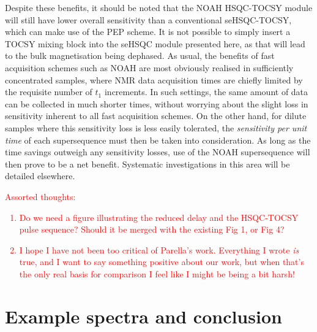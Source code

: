 \documentclass[11pt]{article}
\newcommand*{\red}[1]{\textcolor{red}{#1}}
\begin{document}
Despite these benefits, it should be noted that the NOAH HSQC-TOCSY module will still have lower overall sensitivity than a conventional seHSQC-TOCSY, which can make use of the PEP scheme.
It is not possible to simply insert a TOCSY mixing block into the seHSQC module presented here, as that will lead to the bulk magnetisation being dephased.
As usual, the benefits of fast acquisition schemes such as NOAH are most obviously realised in sufficiently concentrated samples, where NMR data acquisition times are chiefly limited by the requisite number of $t_1$ increments.
In such settings, the same amount of data can be collected in much shorter times, without worrying about the slight loss in sensitivity inherent to all fast acquisition schemes.
On the other hand, for dilute samples where this sensitivity loss is less easily tolerated, the \textit{sensitivity per unit time} of each supersequence must then be taken into consideration.
As long as the time savings outweigh any sensitivity losses, use of the NOAH supersequence will then prove to be a net benefit.
Systematic investigations in this area will be detailed elsewhere.

\red{
    Assorted thoughts:
    \begin{enumerate}
        \item Do we need a figure illustrating the reduced delay and the HSQC-TOCSY pulse sequence? Should it be merged with the existing Fig 1, or Fig 4?
        \item I hope I have not been too critical of Parella's work. Everything I wrote \textit{is} true, and I want to say something positive about our work, but when that's the only real basis for comparison I feel like I might be being a bit harsh!
    \end{enumerate}
}

\section*{Example spectra and conclusion}
\end{document}
